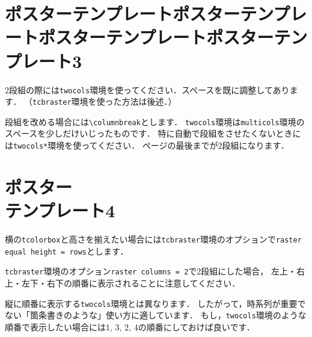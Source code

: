 \documentclass[12pt, a4j, dvipdfmx, jis2004]{jsarticle}
\newenvironment{twocols}{\begin{multicols}{2}[\vspace{-4mm}]}{\end{multicols}}
\begin{document}
\newpage
\section*{ポスターテンプレートポスターテンプレートポスターテンプレートポスターテンプレート3}
\begin{twocols}
\begin{tcbraster}[raster columns = 1]
	\begin{tcolorbox}[title = {\texttt{twocols}環境, \texttt{\textbackslash columnbreak}}]
	2段組の際には\texttt{twocols}環境を使ってください．スペースを既に調整してあります．
	（\texttt{tcbraster}環境を使った方法は後述．）
	
	段組を改める場合には\texttt{\textbackslash columnbreak}とします．
	\tcbline
	\texttt{twocols}環境は\texttt{multicols}環境のスペースを少しだけいじったものです．
	\tcbline
	特に自動で段組をさせたくないときには\texttt{twocols*}環境を使ってください．
	ページの最後までが2段組になります．
	\tcbline
	\lipsum[1][1-3]
	\end{tcolorbox}
\columnbreak
	\begin{tcolorbox}[title = lipsum4]
	\lipsum[4]
	\end{tcolorbox}
	\begin{tcolorbox}[title = lipsum5]
	\lipsum[5]
	\end{tcolorbox}
\end{tcbraster}
\end{twocols}

\newpage
\section*{ポスター\\テンプレート4}
\begin{tcbraster}[raster columns = 2, raster equal height = rows]
	\begin{tcolorbox}[title = 1. 横のものと高さを揃える]
	横の\texttt{tcolorbox}と高さを揃えたい場合には\texttt{tcbraster}環境のオプションで\texttt{raster equal height = rows}とします．
	\end{tcolorbox}
	\begin{tcolorbox}[title = 2. lipsum6]
	\lipsum[6]
	\end{tcolorbox}
	\begin{tcolorbox}[title = 3. 順番]
	\texttt{tcbraster}環境のオプション\texttt{raster columns = 2}で2段組にした場合， 左上・右上・左下・右下の順番に表示されることに注意してください．
	
	縦に順番に表示する\texttt{twocols}環境とは異なります．
	\tcbline
	したがって，時系列が重要でない「箇条書きのような」使い方に適しています．
	\tcbline
	もし，\texttt{twocols}環境のような順番で表示したい場合には1, 3, 2, 4の順番にしておけば良いです．
	\end{tcolorbox}
	\begin{tcolorbox}[title = 4. lipsum7-1]
	\lipsum[7][1]
	\end{tcolorbox}
\end{tcbraster}
\end{document}
